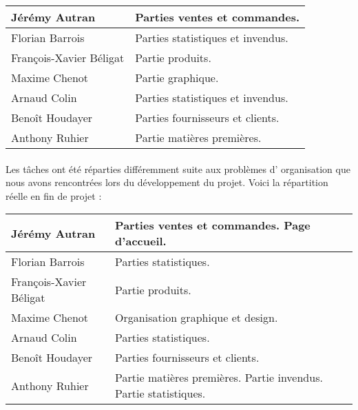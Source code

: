     \begin{center}
        \begin{tabular}{|l|l|}
            \hline
                Jérémy Autran & Parties ventes et commandes. \\
            \hline
                Florian Barrois & Parties statistiques et invendus. \\
            \hline
                François-Xavier Béligat & Partie produits. \\
            \hline
                Maxime Chenot & Partie graphique. \\
            \hline
                Arnaud Colin & Parties statistiques et invendus. \\
            \hline
                Benoît Houdayer & Parties fournisseurs et clients. \\
            \hline
                Anthony Ruhier & Partie matières premières. \\
            \hline
        \end{tabular}
    \end{center}

        \paragraph{}
        Les tâches ont été réparties différemment suite aux problèmes d'
        organisation que nous avons rencontrées lors du développement du projet.
        Voici la répartition réelle en fin de projet :


    \begin{center}
        \begin{tabular}{|l|l|}
            \hline
                Jérémy Autran & Parties ventes et commandes. Page d'accueil.\\
            \hline
                Florian Barrois & Parties statistiques. \\
            \hline
                François-Xavier Béligat & Partie produits. \\
            \hline
                Maxime Chenot & Organisation graphique et design. \\
            \hline
                Arnaud Colin & Parties statistiques. \\
            \hline
                Benoît Houdayer & Parties fournisseurs et clients. \\
            \hline
                Anthony Ruhier & Partie matières premières. Partie invendus.
                                 Partie statistiques.\\
            \hline
        \end{tabular}
    \end{center}



